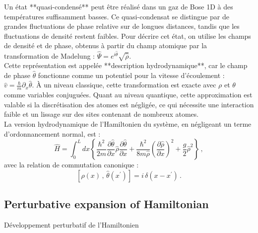 \documentclass[aps,prd,notitlepage,amsfonts,amssymb,amsmath,nofootinbib,superscriptaddress,longbibliography]{revtex4-2}
\newcommand{\trad}[1]{\textcolor{tradcolor}{#1}}
\newcommand{\resumefr}[1]{\textcolor{resumecolor}{#1}}
\begin{document}
\resumefr{
Un état **quasi-condensé** peut être réalisé dans un gaz de Bose 1D à des températures suffisamment basses. Ce quasi-condensat se distingue par de grandes fluctuations de phase relative sur de longues distances, tandis que les fluctuations de densité restent faibles. Pour décrire cet état, on utilise les champs de densité et de phase, obtenus à partir du champ atomique par la transformation de Madelung : \(\hat{\Psi} = e^{i \hat{\theta}} \sqrt{\hat{\rho}}\). \\
Cette représentation est appelée **description hydrodynamique**, car le champ de phase \(\hat{\theta}\) fonctionne comme un potentiel pour la vitesse d'écoulement : \(\hat{v} = \frac{\hbar}{m} \partial_{x}\hat{\theta}\). À un niveau classique, cette transformation est exacte avec \(\rho\) et \(\theta\) comme variables conjuguées. Quant au niveau quantique, cette approximation est valable si la discrétisation des atomes est négligée, ce qui nécessite une interaction faible et un lissage sur des sites contenant de nombreux atomes.\\
La version hydrodynamique de l'Hamiltonien du système, en négligeant un terme d'ordonnancement normal, est :
\begin{equation*}
    \hat{H} = \int_{0}^{L} dx \left\{ \frac{\hbar^2}{2m} \frac{\partial \hat{\theta}}{\partial x} \hat{\rho} \frac{\partial \hat{\theta}}{\partial x} +  \frac{\hbar^2}{8m \hat{\rho}} \left( \frac{\partial \hat{\rho}}{\partial x} \right)^2  + \frac{g}{2} \hat{\rho}^2 \right\} \,,
\end{equation*}
avec la relation de commutation canonique :
\begin{equation*}
    \left[ \hat{\rho}\left(x\right) \,,\, \hat{\theta}\left(x^{\prime}\right) \right] = i \, \delta\left(x-x^{\prime}\right) \,.
\end{equation*}
}


\subsection{Perturbative expansion of Hamiltonian}
\trad{Développement perturbatif de l'Hamiltonien}
\end{document}
